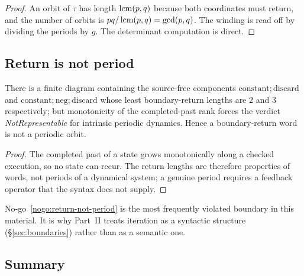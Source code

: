\begin{proof}
An orbit of $\tau$ has length $\operatorname{lcm}(p,q)$ because both coordinates must return, and the
number of orbits is $pq/\operatorname{lcm}(p,q)=\gcd(p,q)$.  The winding is read off by dividing the
periods by $g$.  The determinant computation is direct.
\end{proof}

\subsection{Return is not period}

\begin{nogo}\label{nogo:return-not-period}
There is a finite diagram containing the source-free components
$\mathrm{constant};\mathrm{discard}$ and
$\mathrm{constant};\mathrm{neg};\mathrm{discard}$ whose least boundary-return lengths are
$2$ and $3$ respectively; but monotonicity of the completed-past rank forces the verdict
\emph{NotRepresentable} for intrinsic periodic dynamics.  Hence a boundary-return word is
not a periodic orbit.
\end{nogo}

\begin{proof}
The completed past of a state grows monotonically along a checked execution, so no state
can recur.  The return lengths are therefore properties of words, not periods of a
dynamical system; a genuine period requires a feedback operator that the syntax does not
supply.
\end{proof}

\begin{remark}
No-go~\ref{nogo:return-not-period} is the most frequently violated boundary in this
material.  It is why Part~II treats iteration as a syntactic structure
(\S\ref{sec:boundaries}) rather than as a semantic one.
\end{remark}

\subsection{Summary}

